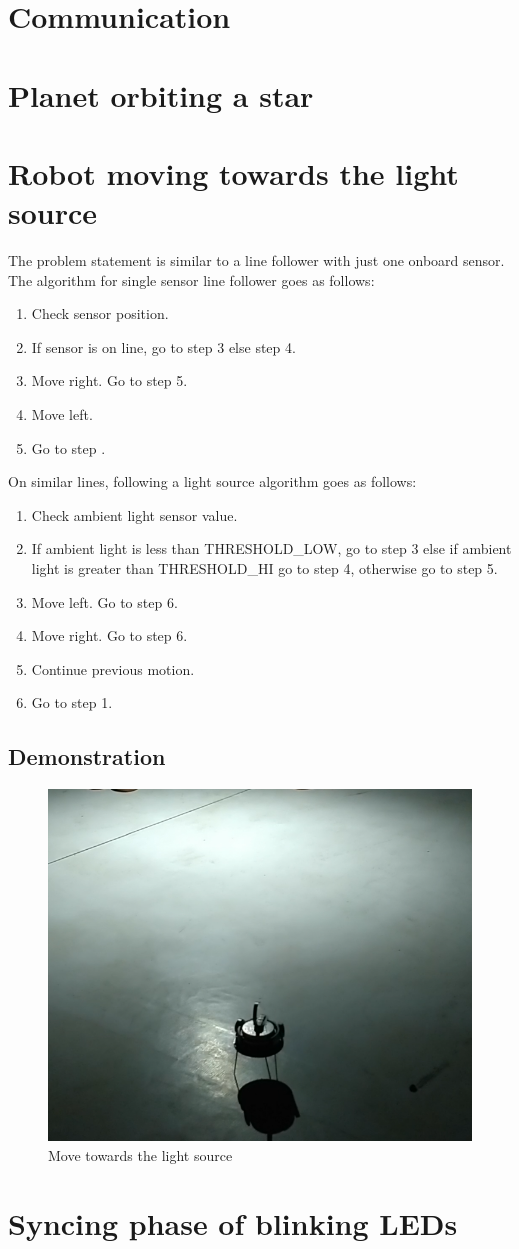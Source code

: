 \documentclass{article}
\begin{document}
\section{Communication}

\section{Planet orbiting a star}

\section{Robot moving towards the light source}
The problem statement is similar to a line follower with just one onboard sensor. The algorithm for single sensor line follower goes as follows:
\begin{enumerate}
    \item Check sensor position.
    \item If sensor is on line, go to step 3 else step 4.
    \item Move right. Go to step 5.
    \item Move left.
    \item Go to step .
\end{enumerate}
On similar lines, following a light source algorithm goes as follows:
\begin{enumerate}
    \item Check ambient light sensor value.
    \item If ambient light is less than THRESHOLD\_LOW, go to step 3 else if ambient light is greater than THRESHOLD\_HI go to step 4, otherwise go to step 5.
    \item Move left. Go to step 6.
    \item Move right. Go to step 6.
    \item Continue previous motion.
    \item Go to step 1.
\end{enumerate}
\subsection{Demonstration}
\begin{figure}
    \centering
    \includegraphics[scale=0.4]{images/move_towards_light}
    \caption{Move towards the light source}
\end{figure}
\section{Syncing phase of blinking LEDs}
\end{document}
